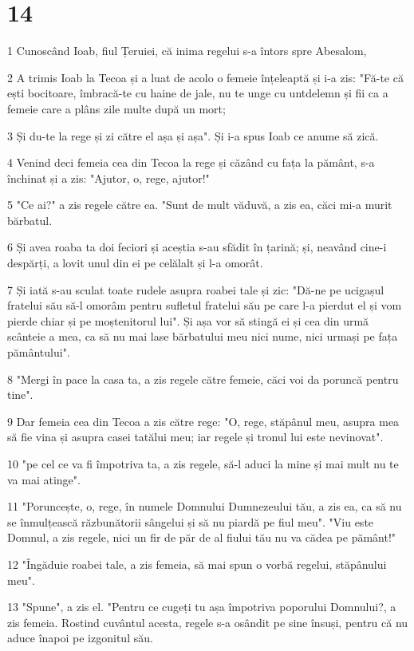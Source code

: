 \chapter{14}

\par 1 Cunoscând Ioab, fiul Țeruiei, că inima regelui s-a întors spre Abesalom,
\par 2 A trimis Ioab la Tecoa și a luat de acolo o femeie înțeleaptă și i-a zis: "Fă-te că ești bocitoare, îmbracă-te cu haine de jale, nu te unge cu untdelemn și fii ca a femeie care a plâns zile multe după un mort;
\par 3 Și du-te la rege și zi către el așa și așa". Și i-a spus Ioab ce anume să zică.
\par 4 Venind deci femeia cea din Tecoa la rege și căzând cu fața la pământ, s-a închinat și a zis: "Ajutor, o, rege, ajutor!"
\par 5 "Ce ai?" a zis regele către ea. "Sunt de mult văduvă, a zis ea, căci mi-a murit bărbatul.
\par 6 Și avea roaba ta doi feciori și aceștia s-au sfădit în țarină; și, neavând cine-i despărți, a lovit unul din ei pe celălalt și l-a omorât.
\par 7 Și iată s-au sculat toate rudele asupra roabei tale și zic: "Dă-ne pe ucigașul fratelui său să-l omorâm pentru sufletul fratelui său pe care l-a pierdut el și vom pierde chiar și pe moștenitorul lui". Și așa vor să stingă ei și cea din urmă scânteie a mea, ca să nu mai lase bărbatului meu nici nume, nici urmași pe fața pământului".
\par 8 "Mergi în pace la casa ta, a zis regele către femeie, căci voi da poruncă pentru tine".
\par 9 Dar femeia cea din Tecoa a zis către rege: "O, rege, stăpânul meu, asupra mea să fie vina și asupra casei tatălui meu; iar regele și tronul lui este nevinovat".
\par 10 "pe cel ce va fi împotriva ta, a zis regele, să-l aduci la mine și mai mult nu te va mai atinge".
\par 11 "Poruncește, o, rege, în numele Domnului Dumnezeului tău, a zis ea, ca să nu se înmulțească răzbunătorii sângelui și să nu piardă pe fiul meu". "Viu este Domnul, a zis regele, nici un fir de păr de al fiului tău nu va cădea pe pământ!"
\par 12 "Îngăduie roabei tale, a zis femeia, să mai spun o vorbă regelui, stăpânului meu".
\par 13 "Spune", a zis el. "Pentru ce cugeți tu așa împotriva poporului Domnului?, a zis femeia. Rostind cuvântul acesta, regele s-a osândit pe sine însuși, pentru că nu aduce înapoi pe izgonitul său.
